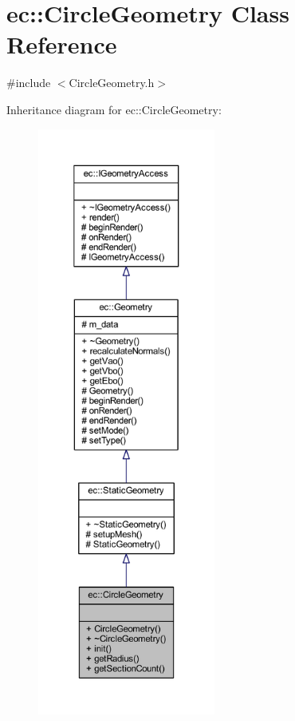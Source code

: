 \hypertarget{classec_1_1_circle_geometry}{}\section{ec\+:\+:Circle\+Geometry Class Reference}
\label{classec_1_1_circle_geometry}


{\ttfamily \#include $<$Circle\+Geometry.\+h$>$}



Inheritance diagram for ec\+:\+:Circle\+Geometry\+:\nopagebreak
\begin{figure}[H]
\begin{center}
\leavevmode
\includegraphics[height=550pt]{classec_1_1_circle_geometry__inherit__graph}
\end{center}
\end{figure}


